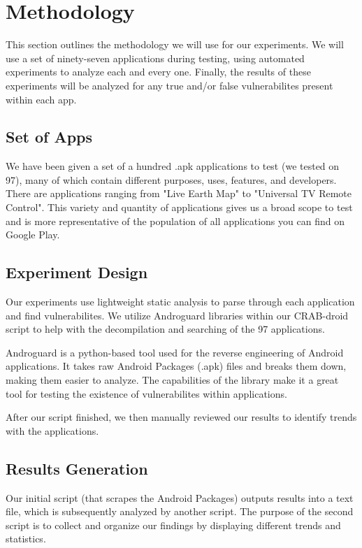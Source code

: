 \section{Methodology}
\label{sec:overview} 

This section outlines the methodology we will use for our experiments.
We will use a set of ninety-seven applications during testing, using
automated experiments to analyze each and every one. Finally, the results
of these experiments will be analyzed for any true and/or false vulnerabilites
present within each app.

\subsection{Set of Apps}

We have been given a set of a hundred .apk applications to test (we tested on 97), many of 
which contain different purposes, uses, features, and developers. There are 
applications ranging from "Live Earth Map" to "Universal TV Remote Control".
This variety and quantity of applications gives us a broad scope to test and is 
more representative of the population of all applications you can find on 
Google Play.

\subsection{Experiment Design}

Our experiments use lightweight static analysis to parse through each
application and find vulnerabilites. We utilize Androguard libraries within our
CRAB-droid script to help with the decompilation and searching of the 97 applications.

Androguard is a python-based tool used for the reverse engineering of
Android applications. It takes raw Android Packages (.apk) files and breaks
them down, making them easier to analyze. The capabilities of the library make it
a great tool for testing the existence of vulnerabilites within applications.

After our script finished, we then manually reviewed our results to identify
trends with the applications.


\subsection{Results Generation}

Our initial script (that scrapes the Android Packages) outputs results into a text file, 
which is subsequently analyzed by another script. The purpose of the second script is to
collect and organize our findings by displaying different trends and statistics.

